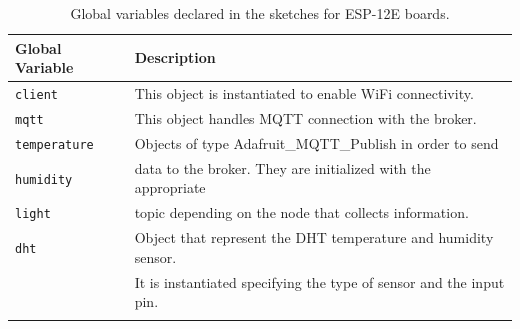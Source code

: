 \noindent\begin{minipage}{\textwidth}
	\begingroup
	\setlength{\LTleft}{-20cm plus -1fill}
	\setlength{\LTright}{\LTleft}
	\begin{longtable}{l | l}
		\hline
		\textbf{Global Variable} & \textbf{Description} \\
		\hline
		\hline
		\texttt{client} & This object is instantiated to enable WiFi connectivity. \\
		\hline
		\texttt{mqtt} & This object handles MQTT connection with the broker. \\
		\hline
		\texttt{temperature} & Objects of type Adafruit\_MQTT\_Publish in order to send \\ 
		\texttt{humidity}    & data to the broker. They are initialized with the appropriate \\
		\texttt{light}       & topic depending on the node that collects information.   \\
		\hline
		\texttt{dht} & Object that represent the DHT temperature and humidity sensor. \\
		             & It is instantiated specifying the type of sensor and the input pin. \\
		\hline
		
		\caption{Global variables declared in the sketches for ESP-12E boards.}
		\label{esp12_global_variables}
	\end{longtable}
	\endgroup
\end{minipage}

